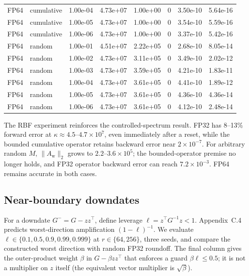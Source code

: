 \documentclass[11pt]{article}
\newcommand{\Aw}{A_{\mathrm w}}
\begin{document}
\begin{landscape}
\begin{longtable}{@{}llrrrrrr@{}}
FP64 & cumulative & 1.00e-04 & 4.73e+07 & 1.00e+00 & 0 & 3.50e-10 & 5.64e-16 \\
FP64 & cumulative & 1.00e-05 & 4.73e+07 & 1.00e+00 & 0 & 3.54e-10 & 5.59e-16 \\
FP64 & cumulative & 1.00e-06 & 4.73e+07 & 1.00e+00 & 0 & 3.37e-10 & 5.42e-16 \\
\midrule
FP64 & random & 1.00e-01 & 4.51e+07 & 2.22e+05 & 0 & 2.68e-10 & 8.05e-14 \\
FP64 & random & 1.00e-02 & 4.73e+07 & 3.11e+05 & 0 & 3.49e-10 & 2.02e-12 \\
FP64 & random & 1.00e-03 & 4.73e+07 & 3.59e+05 & 0 & 4.21e-10 & 1.83e-11 \\
FP64 & random & 1.00e-04 & 4.73e+07 & 3.61e+05 & 0 & 4.41e-10 & 1.89e-12 \\
FP64 & random & 1.00e-05 & 4.73e+07 & 3.61e+05 & 0 & 4.36e-10 & 4.36e-14 \\
FP64 & random & 1.00e-06 & 4.73e+07 & 3.61e+05 & 0 & 4.12e-10 & 2.48e-14 \\
\bottomrule
\end{longtable}
\end{landscape}

The RBF experiment reinforces the controlled-spectrum result.  FP32 has
8--13\% forward error at \(\kappa\approx4.5\)--\(4.7\times10^7\), even
immediately after a reset, while the bounded cumulative operator retains
backward error near \(2\times10^{-7}\).  For arbitrary random \(M\),
\(\|\Aw\|_2\) grows to \(2.2\)--\(3.6\times10^5\); the bounded-operator
premise no longer holds, and FP32 operator backward error can reach
\(7.2\times10^{-3}\).  FP64 remains accurate in both cases.

\subsection{Near-boundary downdates}

For a downdate \(G^-=G-zz^\top\), define leverage
\(\ell=z^\top G^{-1}z<1\).  Appendix~C.4 predicts worst-direction
amplification \((1-\ell)^{-1}\).  We evaluate
\(\ell\in\{0.1,0.5,0.9,0.99,0.999\}\) at \(r\in\{64,256\}\), three seeds, and
compare the constructed worst direction with random FP32 roundoff.  The final
column gives the outer-product weight \(\beta\) in
\(G-\beta zz^\top\) that enforces a guard \(\beta\ell\le0.5\); it is not a
multiplier on \(z\) itself (the equivalent vector multiplier is
\(\sqrt{\beta}\)).
\end{document}

